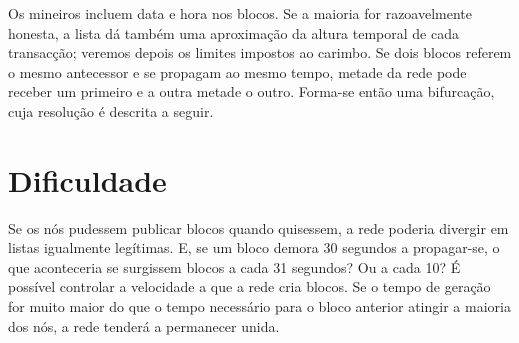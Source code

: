 Os mineiros incluem data e hora nos blocos. Se a maioria for razoavelmente
honesta, a lista dá também uma aproximação da altura temporal de cada
transacção; veremos depois os limites impostos ao carimbo.
Se dois blocos referem o mesmo antecessor e se propagam ao mesmo tempo, metade
da rede pode receber um primeiro e a outra metade o outro. Forma-se então uma
bifurcação, cuja resolução é descrita a seguir.
\section{Dificuldade}
\label{sec:difficulty}

Se os nós pudessem publicar blocos quando quisessem, a rede poderia divergir em
listas igualmente legítimas. E, se um bloco demora 30 segundos a propagar-se,
o que aconteceria se surgissem blocos a cada 31 segundos? Ou a cada 10?
É possível controlar a velocidade a que a rede cria blocos. Se o tempo de
geração for muito maior do que o tempo necessário para o bloco anterior
atingir a maioria dos nós, a rede tenderá a permanecer unida.
